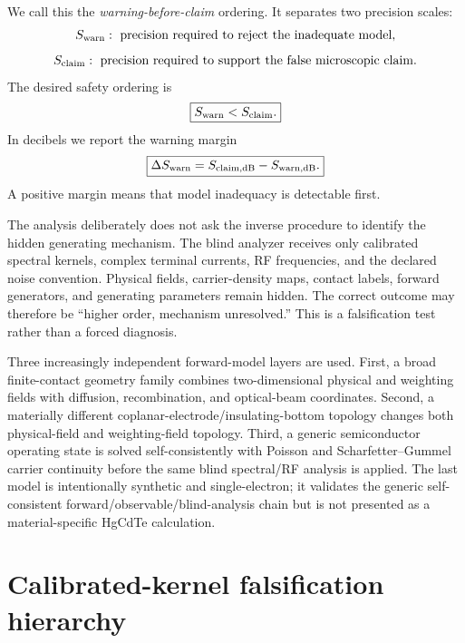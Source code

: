 \documentclass[11pt]{article}
\begin{document}
We call this the \emph{warning-before-claim} ordering. It separates two precision scales:
\begin{equation}
S_{\rm warn}:\ \text{precision required to reject the inadequate model},
\end{equation}
\begin{equation}
S_{\rm claim}:\ \text{precision required to support the false microscopic claim}.
\end{equation}
The desired safety ordering is
\begin{equation}
\boxed{S_{\rm warn}<S_{\rm claim}.}
\label{eq:warning_order}
\end{equation}
In decibels we report the warning margin
\begin{equation}
\boxed{\Delta S_{\rm warn}=S_{\rm claim,dB}-S_{\rm warn,dB}.}
\label{eq:warning_margin}
\end{equation}
A positive margin means that model inadequacy is detectable first.

The analysis deliberately does not ask the inverse procedure to identify the hidden generating mechanism. The blind analyzer receives only calibrated spectral kernels, complex terminal currents, RF frequencies, and the declared noise convention. Physical fields, carrier-density maps, contact labels, forward generators, and generating parameters remain hidden. The correct outcome may therefore be ``higher order, mechanism unresolved.'' This is a falsification test rather than a forced diagnosis.

Three increasingly independent forward-model layers are used. First, a broad finite-contact geometry family combines two-dimensional physical and weighting fields with diffusion, recombination, and optical-beam coordinates. Second, a materially different coplanar-electrode/insulating-bottom topology changes both physical-field and weighting-field topology. Third, a generic semiconductor operating state is solved self-consistently with Poisson and Scharfetter--Gummel carrier continuity before the same blind spectral/RF analysis is applied. The last model is intentionally synthetic and single-electron; it validates the generic self-consistent forward/observable/blind-analysis chain but is not presented as a material-specific HgCdTe calculation.

\section{Calibrated-kernel falsification hierarchy}
\end{document}

